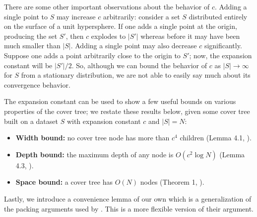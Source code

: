 There are some other important observations about the behavior of $c$.  Adding a
single point to $S$ may increase $c$ arbitrarily: consider a set $S$ distributed
entirely on the surface of a unit hypersphere.  If one adds a single point at
the origin, producing the set $S'$, then $c$ explodes to $|S'|$ whereas before
it may have been much smaller than $|S|$.  Adding a single point may also
decrease $c$ significantly.  Suppose one adds a point arbitrarily close to the
origin to $S'$; now, the expansion constant will be $|S'| / 2$.  So, although we
can bound the behavior of $c$ as $|S| \to \infty$ for $S$ from a stationary
distribution, we are not able to easily say much about its convergence behavior.

The expansion constant can be used to show a few useful bounds on various
properties of the cover tree; we restate these results below, given some cover
tree built on a dataset $S$ with expansion constant $c$ and $|S| = N$:

\begin{itemize}
  \item {\bf Width bound:} no cover tree node has more than $c^4$ children
(Lemma 4.1, \cite{langford2006}).

  \item {\bf Depth bound:} the maximum depth of any node is $O(c^2 \log N)$
(Lemma 4.3, \cite{langford2006}).

  \item {\bf Space bound:} a cover tree has $O(N)$ nodes (Theorem 1,
\cite{langford2006}).
\end{itemize}



Lastly, we introduce a convenience lemma of our own which is a generalization of
the packing arguments used by \citet{langford2006}.  This is a more flexible
version of their argument.

